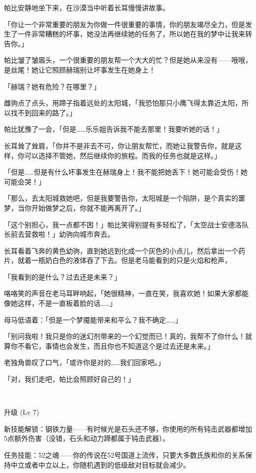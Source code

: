 帕比安静地坐下来，在沙漠当中听着长耳慢慢讲故事。

「你让一个非常重要的朋友为你做一件很重要的事情，你的朋友竭尽全力，但是发生了一件非常糟糕的坏事，她没法再继续她的任务了，所以她在我的梦中让我来转告你。」

帕比皱了皱眉头，一个很重要的朋友帮一个大大的忙？但是她从来没有——哦哦，是丝尾！她让它照顾赫瑞别让坏事发生在她身上！

「赫瑞？她有危险？在哪里？」

雌驹点了点头，用蹄子指着远处的太阳城，「我恐怕那只小鹰飞得太靠近太阳，所以找不到回来的路了。」

帕比犹豫了一会，「但是……乐乐姐告诉我不能去那里！我要听她的话！」

长耳耸了耸肩，「你并不是非去不可，你让朋友帮忙，而她让我警告你，就是这样，你可以选择不管她，然后继续你的旅程。而我的任务也就是这样。」

「但是……但是有什么坏事发生在赫瑞身上！我不能把她丢下！她可能会受伤！她可能会哭！」

「那么，去太阳城救她吧，但是我要警告你，太阳城是一个陷阱，是个真实的噩梦，当你开始做梦之后，你就不能再离开了。」

「这个别担心，我一点都不困！」帕比笑得别提有多轻松了，「太空战士安德洛队长前去营救啦！」幼驹向城市奔去。

长耳看着飞奔的黄色幼驹，直到她远到化成一个灰色的小点儿，然后拿出一个药片，就着一瓶奶白色的液体吞了下去。但是老马能看到的只是火焰和枪声，

「我看到的是什么？过去还是未来？」

咯咯笑的声音在老马耳畔响起，「她很精神，一直在笑，我喜欢她！如果大家都能像她这样，不是一直板着脸的话……」

母马低语着：「但是一个梦魇能带来和平么？我不确定……」

「别问我啦！我只是你的迷幻剂带来的一个幻觉而已！真的，我帮不了你什么！就算你不看它，事情也会发生，而且你也不知道这个是过去还是未来。」

老独角兽叹了口气，「或许你是对的……我们回家吧。」

「对，我们走吧，帕比会照顾好自己的！」

~\vfill

\begin{note}
升级 (Lv 7)

新技能解锁：钢铁力量——有时候光是石头还不够，你使用的所有钝击武器都增加5点额外伤害（没错，石头和动力蹄都属于钝击武器）。

任务技能：52之魂——你的传说在52号国道上流传，只要大多数氏族和你的关系保持中立或者中立以上，你随机遇到的低级敌对目标就会减少。
\end{note}


